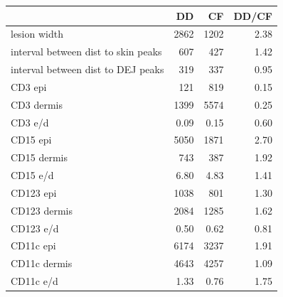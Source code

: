 \begin{tabular}{lrrr}
   \hline  &DD& CF& DD/CF\\ 
\hline
lesion width & 2862 & 1202 & 2.38 \\ 
  interval between dist to skin peaks & 607 & 427 & 1.42 \\ 
  interval between dist to DEJ peaks & 319 & 337 & 0.95 \\ 
   \hline
CD3 epi & 121 & 819 & 0.15 \\ 
  CD3 dermis & 1399 & 5574 & 0.25 \\ 
  CD3 e/d & 0.09 & 0.15 & 0.60 \\ 
   \hline
CD15 epi & 5050 & 1871 & 2.70 \\ 
  CD15 dermis & 743 & 387 & 1.92 \\ 
  CD15 e/d & 6.80 & 4.83 & 1.41 \\ 
   \hline
CD123 epi & 1038 & 801 & 1.30 \\ 
  CD123 dermis & 2084 & 1285 & 1.62 \\ 
  CD123 e/d & 0.50 & 0.62 & 0.81 \\ 
   \hline
CD11c epi & 6174 & 3237 & 1.91 \\ 
  CD11c dermis & 4643 & 4257 & 1.09 \\ 
  CD11c e/d & 1.33 & 0.76 & 1.75 \\ 
   \hline
\end{tabular}

